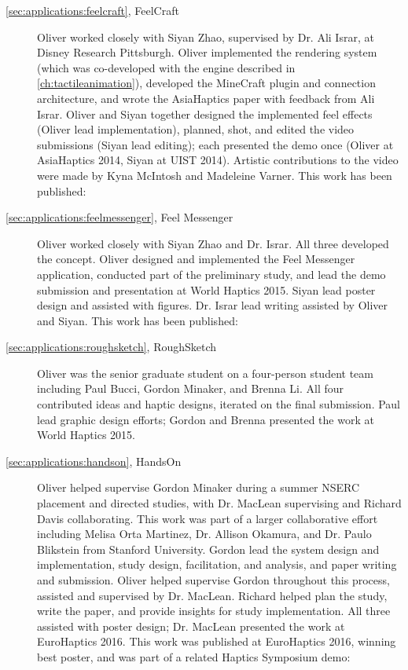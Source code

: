 \begin{description}

\item[\autoref{sec:applications:feelcraft}, FeelCraft] Oliver worked closely with Siyan Zhao, supervised by Dr. Ali Israr, at Disney Research Pittsburgh.
Oliver implemented the rendering system (which was co-developed with the engine described in \autoref{ch:tactileanimation}), developed the MineCraft plugin and connection architecture, and wrote the AsiaHaptics paper with feedback from Ali Israr.
Oliver and Siyan together designed the implemented feel effects (Oliver lead implementation), planned, shot, and edited the video submissions (Siyan lead editing); each presented the demo once (Oliver at AsiaHaptics 2014, Siyan at UIST 2014).
Artistic contributions to the video were made by Kyna McIntosh and Madeleine Varner.
This work has been published:



\item[\autoref{sec:applications:feelmessenger}, Feel Messenger] Oliver worked closely with Siyan Zhao and Dr. Israr.
All three developed the concept.
Oliver designed and implemented the Feel Messenger application, conducted part of the preliminary study, and lead the demo submission and presentation at World Haptics 2015.
Siyan lead poster design and assisted with figures.
Dr. Israr lead writing assisted by Oliver and Siyan.
This work has been published:


\item[\autoref{sec:applications:roughsketch}, RoughSketch] Oliver was the senior graduate student on a four-person student team including Paul Bucci, Gordon Minaker, and Brenna Li.
All four contributed ideas and haptic designs, iterated on the final submission.
Paul lead graphic design efforts; Gordon and Brenna presented the work at World Haptics 2015.

\item[\autoref{sec:applications:handson}, HandsOn] Oliver helped supervise Gordon Minaker during a summer NSERC placement and directed studies, with Dr. MacLean supervising and Richard Davis collaborating.
This work was part of a larger collaborative effort including Melisa Orta Martinez, Dr. Allison Okamura, and Dr. Paulo Blikstein from Stanford University.
Gordon lead the system design and implementation, study design, facilitation, and analysis, and paper writing and submission.
Oliver helped supervise Gordon throughout this process, assisted and supervised by Dr. MacLean.
Richard helped plan the study, write the paper, and provide insights for study implementation.
All three assisted with poster design; Dr. MacLean presented the work at EuroHaptics 2016.
This work was published at EuroHaptics 2016, winning best poster, and was part of a related Haptics Symposium demo:


\end{description}
